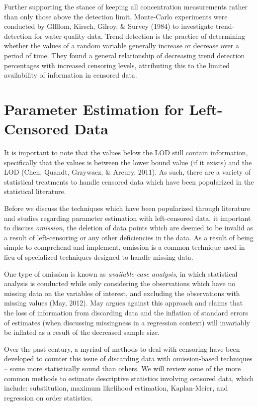 \documentclass[12pt, twoside]{amherstthesis}
\begin{document}
Further supporting the stance of keeping all concentration measurements rather than only those above the detection limit, Monte-Carlo experiments were conducted by Gllllom, Kirsch, Gilroy, \& Survey (1984) to investigate trend-detection for water-quality data. Trend detection is the practice of determining whether the values of a random variable generally increase or decrease over a period of time. They found a general relationship of decreasing trend detection percentages with increased censoring levels, attributing this to the limited availability of information in censored data.

\hypertarget{Approaches}{%
\section{Parameter Estimation for Left-Censored Data}\label{Approaches}}

It is important to note that the values below the LOD still contain information, specifically that the values is between the lower bound value (if it exists) and the LOD (Chen, Quandt, Grzywacz, \& Arcury, 2011). As such, there are a variety of statistical treatments to handle censored data which have been popularized in the statistical literature.

Before we discuss the techniques which have been popularized through literature and studies regarding parameter estimation with left-censored data, it important to discuss \emph{omission}, the deletion of data points which are deemed to be invalid as a result of left-censoring or any other deficiencies in the data. As a result of being simple to comprehend and implement, omission is a common technique used in lieu of specialized techniques designed to handle missing data.

One type of omission is known as \emph{available-case analysis}, in which statistical analysis is conducted while only considering the observations which have no missing data on the variables of interest, and excluding the observations with missing values (May, 2012). May argues against this approach and claims that the loss of information from discarding data and the inflation of standard errors of estimates (when discussing missingness in a regression context) will invariably be inflated as a result of the decreased sample size.

Over the past century, a myriad of methods to deal with censoring have been developed to counter this issue of discarding data with omission-based techniques -- some more statistically sound than others. We will review some of the more common methods to estimate descriptive statistics involving censored data, which include: substitution, maximum likelihood estimation, Kaplan-Meier, and regression on order statistics.
\end{document}
